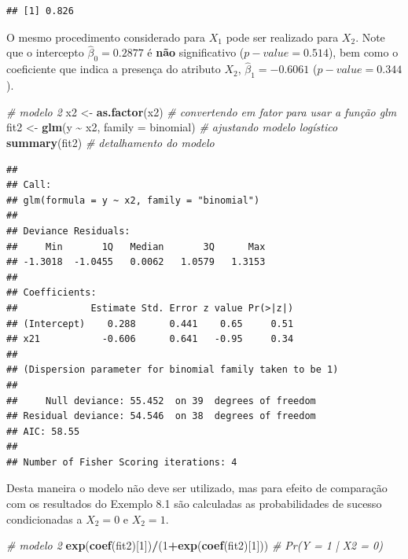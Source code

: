 \documentclass[
]{book}
\newenvironment{Shaded}{\begin{snugshade}}{\end{snugshade}}
\newcommand{\CommentTok}[1]{\textcolor[rgb]{0.56,0.35,0.01}{\textit{#1}}}
\newcommand{\DataTypeTok}[1]{\textcolor[rgb]{0.13,0.29,0.53}{#1}}
\newcommand{\DecValTok}[1]{\textcolor[rgb]{0.00,0.00,0.81}{#1}}
\newcommand{\KeywordTok}[1]{\textcolor[rgb]{0.13,0.29,0.53}{\textbf{#1}}}
\newcommand{\NormalTok}[1]{#1}
\newcommand{\OperatorTok}[1]{\textcolor[rgb]{0.81,0.36,0.00}{\textbf{#1}}}
\newcommand{\StringTok}[1]{\textcolor[rgb]{0.31,0.60,0.02}{#1}}
\theoremstyle{definition}
\theoremstyle{definition}
\theoremstyle{definition}
\theoremstyle{remark}
\begin{document}
\begin{verbatim}
## [1] 0.826
\end{verbatim}

O mesmo procedimento considerado para \(X_1\) pode ser realizado para \(X_2\). Note que o intercepto \(\hat{\beta}_0 = 0.2877\) é \textbf{não} significativo (\(p-value = 0.514\)), bem como o coeficiente que indica a presença do atributo \(X_2\), \(\hat{\beta}_1 = -0.6061\) (\(p-value = 0.344\)).

\begin{Shaded}
\begin{Highlighting}[]
\CommentTok{\# modelo 2}
\NormalTok{x2 \textless{}{-}}\StringTok{ }\KeywordTok{as.factor}\NormalTok{(x2)  }\CommentTok{\# convertendo em fator para usar a função glm}
\NormalTok{fit2 \textless{}{-}}\StringTok{ }\KeywordTok{glm}\NormalTok{(y }\OperatorTok{\textasciitilde{}}\StringTok{ }\NormalTok{x2, }\DataTypeTok{family =} \StringTok{\textquotesingle{}binomial\textquotesingle{}}\NormalTok{) }\CommentTok{\# ajustando modelo logístico}
\KeywordTok{summary}\NormalTok{(fit2) }\CommentTok{\# detalhamento do modelo}
\end{Highlighting}
\end{Shaded}

\begin{verbatim}
## 
## Call:
## glm(formula = y ~ x2, family = "binomial")
## 
## Deviance Residuals: 
##     Min       1Q   Median       3Q      Max  
## -1.3018  -1.0455   0.0062   1.0579   1.3153  
## 
## Coefficients:
##             Estimate Std. Error z value Pr(>|z|)
## (Intercept)    0.288      0.441    0.65     0.51
## x21           -0.606      0.641   -0.95     0.34
## 
## (Dispersion parameter for binomial family taken to be 1)
## 
##     Null deviance: 55.452  on 39  degrees of freedom
## Residual deviance: 54.546  on 38  degrees of freedom
## AIC: 58.55
## 
## Number of Fisher Scoring iterations: 4
\end{verbatim}

Desta maneira o modelo não deve ser utilizado, mas para efeito de comparação com os resultados do Exemplo 8.1 são calculadas as probabilidades de sucesso condicionadas a \(X_2=0\) e \(X_2=1\).

\begin{Shaded}
\begin{Highlighting}[]
\CommentTok{\# modelo 2}
\KeywordTok{exp}\NormalTok{(}\KeywordTok{coef}\NormalTok{(fit2)[}\DecValTok{1}\NormalTok{])}\OperatorTok{/}\NormalTok{(}\DecValTok{1}\OperatorTok{+}\KeywordTok{exp}\NormalTok{(}\KeywordTok{coef}\NormalTok{(fit2)[}\DecValTok{1}\NormalTok{])) }\CommentTok{\# Pr(Y = 1 | X2 = 0)}
\end{Highlighting}
\end{Shaded}
\end{document}
